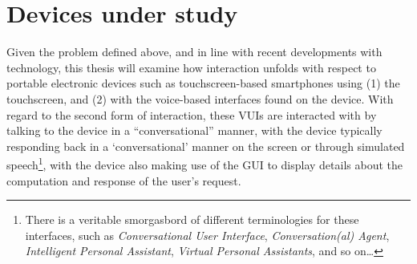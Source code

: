 


\crpagebreak\section{Devices under study}\label{sec:intro devices}
Given the problem defined above, and in line with recent developments with technology, this thesis will examine how interaction unfolds with respect to portable electronic devices such as touchscreen-based smartphones using (1) the touchscreen, and (2) with the voice-based interfaces found on the device.
With regard to the second form of interaction, these \acfp{VUI} are interacted with by talking to the device in a ``conversational'' manner, with the device typically responding back in a `conversational' manner on the screen or through simulated speech\footnote{There is a veritable smorgasbord of different terminologies for these interfaces, such as \textit{Conversational User Interface}, \textit{Conversation(al) Agent}, \textit{Intelligent Personal Assistant}, \textit{Virtual Personal Assistants}, and so on\ldots}, with the device also making use of the \acf{GUI} to display details about the computation and response of the user's request.

